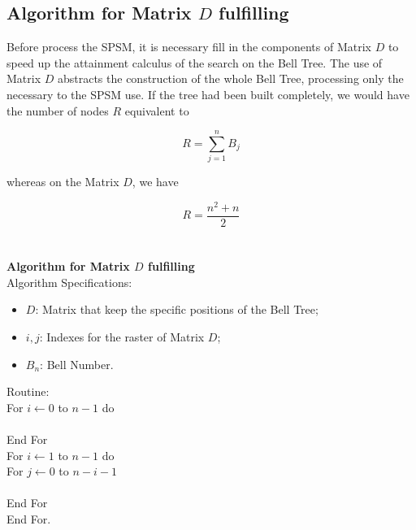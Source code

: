 \documentclass {amsart}
\begin{document}
\subsection*{Algorithm for Matrix {$D$} fulfilling}

Before process the SPSM, it is necessary fill in the components of
Matrix {$D$} to speed up the attainment calculus of the search on
the Bell Tree. The use of Matrix {$D$} abstracts the construction
of the whole Bell Tree, processing only the necessary to the SPSM
use. If the tree had been built completely, we would have the
number of nodes {$R$} equivalent to

\begin{equation} \label{eqb}
R = \sum_{j=1}^{n}B_j
\end{equation}

whereas on the Matrix {$D$}, we have

\begin{equation} \label{eqb}
R = \frac{n^2 + n}{2}
\end{equation}
\\\\
\textbf{Algorithm for Matrix {$D$} fulfilling}\\
Algorithm Specifications:

\begin{itemize}
\item {$D$}: Matrix that keep the specific positions of the Bell
Tree;

\item {$i,j$}: Indexes for the raster of Matrix {$D$};

\item{$B_n$}: Bell Number.

\end{itemize}
Routine: \\
\indent For {$i \leftarrow 0$} to {$n-1$} do\\
\indent {}\\
\indent End For\\
\indent For {$i \leftarrow 1$} to {$n-1$} do\\
\indent \indent For {$j \leftarrow 0$} to {$n-i-1$}\\
\indent \indent {}\\
\indent \indent End For\\
\indent End For.


\end{document}
